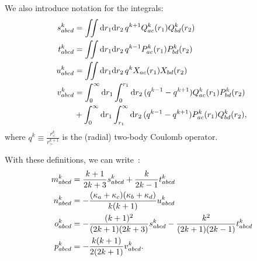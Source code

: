\documentclass[10pt,twocolumn,a4paper]{article}%
\def\d{\ensuremath{{\rm d}}}
\renewcommand{\k}{\ensuremath{\kappa}}
\begin{document}
We also introduce notation for the integrals:
\begin{equation}
\begin{split}
    s^k_{abcd} &= \iint\d r_1\d r_2 \, q^{k+1}Q^k_{ac}(r_1)Q^k_{bd}(r_2)\\
    t^k_{abcd} &= \iint\d r_1\d r_2 \, q^{k-1}P^k_{ac}(r_1)P^k_{bd}(r_2)\\
    u^k_{abcd} &= \iint\d r_1\d r_2 \, q^{k}X_{ac}(r_1)X_{bd}(r_2)\\
    v^k_{abcd} &= \int_0^\infty\d r_1\int_0^{r_1}\d r_2 \, (q^{k-1}-q^{k+1})Q^k_{ac}(r_1)P^k_{bd}(r_2)\\
    &+ \int_0^\infty\d r_1\int_{r_1}^\infty\d r_2 \, (q^{k-1}-q^{k+1})P^k_{ac}(r_1)Q^k_{bd}(r_2),
\end{split}
\end{equation}
where $q^k\equiv\frac{r_<^k}{r_>^{k+1}}$ is the (radial) two-body Coulomb operator.
\begin{comment}
These can also be expressed:
\begin{equation}
\begin{split}
    s^k_{abcd} &= \int\d r\, Q^k_{ac}(r)\left(\frac{\Delta_{bd}}{k+1}g^{k+1}_{bd}(r) + b^{k+1}_{bd}(r)\right)\\
    t^k_{abcd} &= \int\d r P^k_{ac}(r)\left(\frac{\Delta_{bd}}{k}g^{k-1}_{bd}(r) - b^{k-1}_{bd}(r)\right)\\
    u^k_{abcd} &= \int\d r\, X_{ac}(r)g^k_{bd}(r)\\
    v^k_{abcd} &= \int\d r\,  Q^k_{ac}(r)\Bigg(\frac{\Delta_{bd}}{k}\left[g^{0,k-1}_{bd}(r)-g^{0,k+1}_{bd}(r)\right] \\
    &\hspace{2.75cm}- b^{0,k-1}_{bd}(r)+b^{0,k+1}_{bd}(r)\Bigg)\\
    &+\int\d r\,  P^k_{ac}(r)\Bigg(\frac{\Delta_{bd}}{k+1}\left[g^{\infty,k-1}_{bd}(r)-g^{\infty,k+1}_{bd}(r)\right] \\
    &\hspace{2.75cm}+ b^{\infty,k-1}_{bd}(r)-b^{\infty,k+1}_{bd}(r)\Bigg).
\end{split}
\end{equation}
\end{comment}
With these definitions, we can write~\cite{Mann1971,JohnsonBook2007}:
\begin{align}
m^k_{abcd} &= \frac{k+1}{2k+3}s^k_{abcd}+\frac{k}{2k-1}t^k_{abcd}\notag\\
n^k_{abcd} &= -\frac{(\k_a+\k_c)(\k_b+\k_d)}{k(k+1)}u^k_{abcd}\\
o^k_{abcd} &= -\frac{(k+1)^2}{(2k+1)(2k+3)}s^k_{abcd}-\frac{k^2}{(2k+1)(2k-1)}t^k_{abcd}\notag\\
p^k_{abcd} &= -\frac{k(k+1)}{2(2k+1)}v^k_{abcd}.\notag
\end{align}
\end{document}
